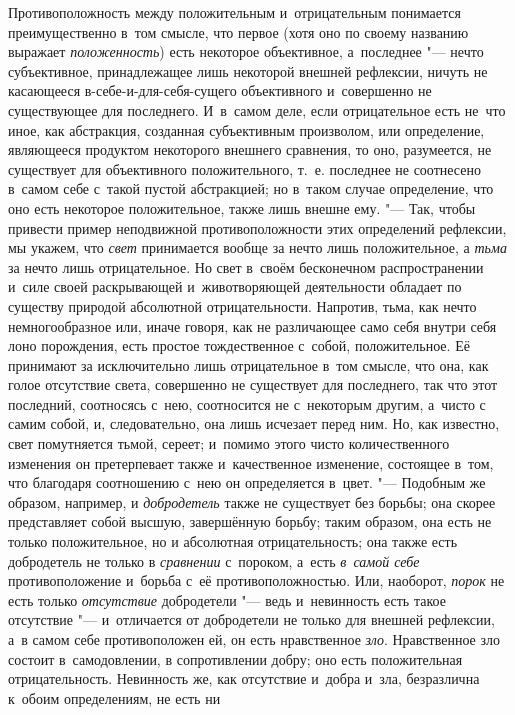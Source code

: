 Противоположность между положительным и~отрицательным понимается
преимущественно в~том смысле, что первое (хотя оно по своему названию
выражает {\em положенность}) есть некоторое
объективное, а~последнее "--- нечто субъективное, принадлежащее лишь некоторой
внешней рефлексии, ничуть не касающееся в-себе-и-для-себя-сущего
объективного и~совершенно не существующее для последнего. И~в~самом деле,
если отрицательное есть не~что иное, как абстракция, созданная субъективным
произволом, или определение, являющееся продуктом некоторого внешнего
сравнения, то оно, разумеется, не существует для объективного
положительного, т.~е. последнее не соотнесено в~самом себе с~такой пустой
абстракцией; но в~таком случае определение, что оно есть некоторое
положительное, также лишь внешне ему. "--- Так, чтобы привести пример
неподвижной противоположности этих определений рефлексии, мы укажем, что
{\em свет} принимается вообще за нечто лишь
положительное, а {\em тьма} за нечто лишь
отрицательное. Но свет в~своём бесконечном распространении и~силе своей
раскрывающей и~животворяющей деятельности обладает по существу природой
абсолютной отрицательности. Напротив, тьма, как нечто немногообразное или,
иначе говоря, как не различающее само себя внутри себя лоно порождения,
есть простое тождественное с~собой, положительное. Её принимают за
исключительно лишь отрицательное в~том смысле, что она, как голое
отсутствие света, совершенно не существует для последнего, так что этот
последний, соотносясь с~нею, соотносится не с~некоторым другим, а~чисто с
самим собой, и, следовательно, она лишь исчезает перед ним. Но, как
известно, свет помутняется тьмой, сереет; и~помимо этого чисто
количественного изменения он претерпевает также и~качественное изменение,
состоящее в~том, что благодаря соотношению с~нею он определяется
в~цвет. "--- Подобным же образом, например, и {\em добродетель}
также не существует без борьбы; она скорее представляет собой высшую,
завершённую борьбу; таким образом, она есть не только положительное, но и
абсолютная отрицательность; она также есть добродетель не только в
{\em сравнении} с~пороком, а~есть
{\em в~самой себе} противоположение и~борьба с~её
противоположностью. Или, наоборот, {\em порок} не есть
только {\em отсутствие} добродетели "--- ведь и~невинность
есть такое отсутствие "--- и~отличается от добродетели не только для внешней
рефлексии, а~в самом себе противоположен ей, он есть нравственное
{\em зло}. Нравственное зло состоит в~самодовлении, в
сопротивлении добру; оно есть положительная отрицательность. Невинность же,
как отсутствие и~добра и~зла, безразлична к~обоим определениям, не есть ни
